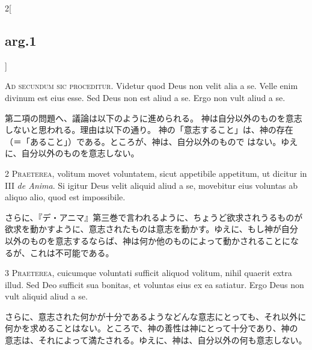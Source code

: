 \documentclass[paper=a4paper,fontsize=10pt,jafontsize=9pt,titlepage]{jlreq}
\begin{document}
\begin{paracol}{2}[\subsection{arg.1}]


{\huge A}{\scshape d secundum sic proceditur}. Videtur quod Deus non
 velit alia a se. Velle enim divinum est eius esse. Sed Deus non est
 aliud a se. Ergo non vult aliud a se.

\switchcolumn

第二項の問題へ、議論は以下のように進められる。
神は自分以外のものを意志しないと思われる。理由は以下の通り。
神の「意志すること」は、神の存在（＝「あること」）である。ところが、神は、自分以外のもので
 はない。ゆえに、自分以外のものを意志しない。



{\scshape 2 Praeterea}, volitum movet voluntatem, sicut appetibile
 appetitum, ut dicitur in III {\itshape de Anima}. Si igitur Deus velit aliquid
 aliud a se, movebitur eius voluntas ab aliquo alio, quod est
 impossibile.

\switchcolumn

さらに、『デ・アニマ』第三巻で言われるように、ちょうど欲求されうるものが
 欲求を動かすように、意志されたものは意志を動かす。ゆえに、もし神が自分
 以外のものを意志するならば、神は何か他のものによって動かされることにな
 るが、これは不可能である。



{\scshape 3 Praeterea}, cuicumque voluntati sufficit aliquod volitum,
 nihil quaerit extra illud. Sed Deo sufficit sua bonitas, et voluntas
 eius ex ea satiatur. Ergo Deus non vult aliquid aliud a se.

\switchcolumn

さらに、意志された何かが十分であるようなどんな意志にとっても、それ以外に
 何かを求めることはない。ところで、神の善性は神にとって十分であり、神の
 意志は、それによって満たされる。ゆえに、神は、自分以外の何も意志しない。




\end{paracol}
\end{document}
